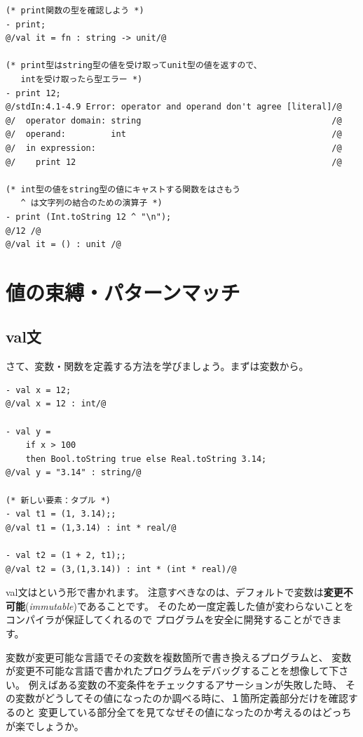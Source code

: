 \documentclass[11pt,a4paper]{jarticle}
\begin{document}
\begin{lstlisting}[caption=型エラー２,label=code:type-error2]
(* print関数の型を確認しよう *)
- print;
@/val it = fn : string -> unit/@

(* print型はstring型の値を受け取ってunit型の値を返すので、
   intを受け取ったら型エラー *)
- print 12;
@/stdIn:4.1-4.9 Error: operator and operand don't agree [literal]/@
@/  operator domain: string                                      /@
@/  operand:         int                                         /@
@/  in expression:                                               /@
@/    print 12                                                   /@

(* int型の値をstring型の値にキャストする関数をはさもう
   ^ は文字列の結合のための演算子 *)
- print (Int.toString 12 ^ "\n");
@/12 /@
@/val it = () : unit /@
\end{lstlisting}


\section{値の束縛・パターンマッチ}
\subsection{val文}
さて、変数・関数を定義する方法を学びましょう。まずは変数から。
\begin{lstlisting}[caption={val文}, label={code:first-definition}]
- val x = 12;
@/val x = 12 : int/@

- val y =
    if x > 100
    then Bool.toString true else Real.toString 3.14;
@/val y = "3.14" : string/@

(* 新しい要素：タプル *)
- val t1 = (1, 3.14);;
@/val t1 = (1,3.14) : int * real/@

- val t2 = (1 + 2, t1);;
@/val t2 = (3,(1,3.14)) : int * (int * real)/@
\end{lstlisting}

val文はという形で書かれます。
注意すべきなのは、デフォルトで変数は{\bfseries 変更不可能}({\itshape immutable})であることです。
そのため一度定義した値が変わらないことをコンパイラが保証してくれるので
プログラムを安全に開発することができます。

変数が変更可能な言語でその変数を複数箇所で書き換えるプログラムと、
変数が変更不可能な言語で書かれたプログラムをデバッグすることを想像して下さい。
例えばある変数の不変条件をチェックするアサーションが失敗した時、
その変数がどうしてその値になったのか調べる時に、１箇所定義部分だけを確認するのと
変更している部分全てを見てなぜその値になったのか考えるのはどっちが楽でしょうか。
\end{document}
